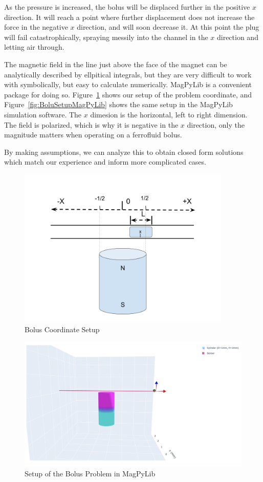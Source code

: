 \documentclass{asme2ej}
\begin{document}
As the pressure is increased, the bolus will be displaced further
in the positive $x$ direction.
It will reach a point where further displacement does not increase
the force in the negative $x$ direction, and will soon decrease it.
At this point the plug will fail
catastrophically, spraying messily into the channel in the $x$ direction and letting air through.

The magnetic field in the line just above the face of the magnet can be analytically
described by ellpitical integrals, but they are very difficult to work with symbolically,
but easy to calculate numerically.
MagPyLib is a convenient package for doing so.
Figure~\ref{fig:BolusSetup} shows our setup of the problem coordinate,
and Figure~\ref{fig:BoluSetupMagPyLib} shows the same setup in the MagPyLib simulation software.
The $x$ dimesion is the horizontal, left to right dimension.
The field is polarized, which is why it is negative in the $x$ direction, only
the magnitude matters when
operating on a ferrofluid bolus.

By making assumptions, we can
analyze this to obtain closed form solutions which match our
experience and inform more complicated cases.

\begin{figure}[h]
\centerline{\includegraphics[width=4in]{figure/BolusSetup.png}}
\caption{Bolus Coordinate Setup}
\label{fig:BolusSetup}
\end{figure}


\begin{figure}[h]
\centerline{\includegraphics[width=6in]{figure/SetupBolusProblem.png}}
\caption{Setup of the Bolus Problem in MagPyLib}
\label{fig:BolusSetupMagPyLib}
\end{figure}
\end{document}
